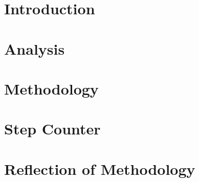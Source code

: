 



\frontmatter 

\cleardoublepage

\cleardoublepage

\cleardoublepage

\setlength\parskip{0ex} %
\tableofcontents* %
\setlength{\parskip}{3mm} %


\mainmatter
{} %
\pagestyle{custom}

\chapter{Introduction}
\label{chap:intro}


\chapter{Analysis}
\label{chap:analysis}


\chapter{Methodology}
\label{chap:methodology}


\chapter{Step Counter}
\label{chap:stepCounter}


\chapter{Reflection of Methodology}
\label{chap:reflectionMethodology}


